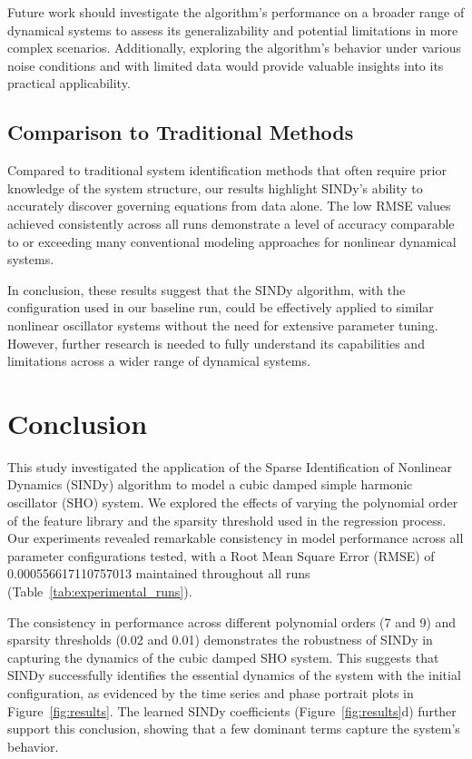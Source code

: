 \documentclass{article} %
\begin{document}
Future work should investigate the algorithm's performance on a broader range of dynamical systems to assess its generalizability and potential limitations in more complex scenarios. Additionally, exploring the algorithm's behavior under various noise conditions and with limited data would provide valuable insights into its practical applicability.

\subsection{Comparison to Traditional Methods}

Compared to traditional system identification methods that often require prior knowledge of the system structure, our results highlight SINDy's ability to accurately discover governing equations from data alone. The low RMSE values achieved consistently across all runs demonstrate a level of accuracy comparable to or exceeding many conventional modeling approaches for nonlinear dynamical systems.

In conclusion, these results suggest that the SINDy algorithm, with the configuration used in our baseline run, could be effectively applied to similar nonlinear oscillator systems without the need for extensive parameter tuning. However, further research is needed to fully understand its capabilities and limitations across a wider range of dynamical systems.

\section{Conclusion}
\label{sec:conclusion}

This study investigated the application of the Sparse Identification of Nonlinear Dynamics (SINDy) algorithm to model a cubic damped simple harmonic oscillator (SHO) system. We explored the effects of varying the polynomial order of the feature library and the sparsity threshold used in the regression process. Our experiments revealed remarkable consistency in model performance across all parameter configurations tested, with a Root Mean Square Error (RMSE) of 0.000556617110757013 maintained throughout all runs (Table~\ref{tab:experimental_runs}).

The consistency in performance across different polynomial orders (7 and 9) and sparsity thresholds (0.02 and 0.01) demonstrates the robustness of SINDy in capturing the dynamics of the cubic damped SHO system. This suggests that SINDy successfully identifies the essential dynamics of the system with the initial configuration, as evidenced by the time series and phase portrait plots in Figure~\ref{fig:results}. The learned SINDy coefficients (Figure~\ref{fig:results}d) further support this conclusion, showing that a few dominant terms capture the system's behavior.
\end{document}
